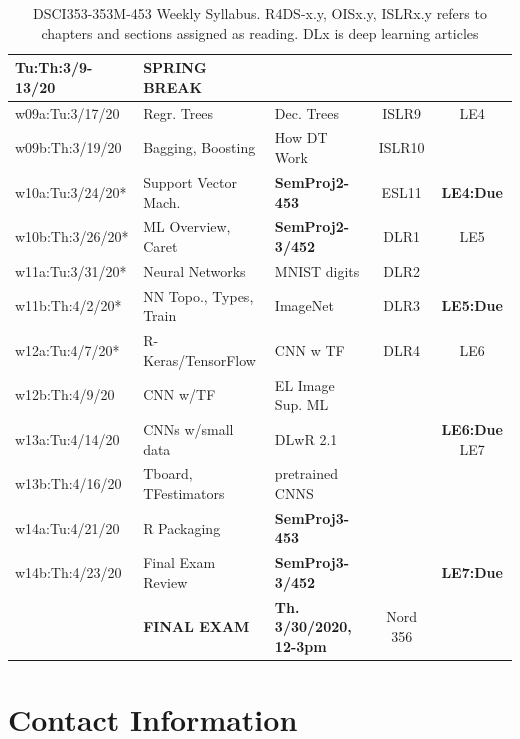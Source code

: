 \documentclass[11pt]{article} %
\begin{document}
\begin{table}[h]
\begin{tabular}{| l | p{4cm} | p{4cm} | c | c |}
    \hline
    \hline 
    Tu:Th:3/9-13/20 & {\bf SPRING BREAK} &  &  &  \\ 
    \hline
    \hline 
    w09a:Tu:3/17/20 & Regr. Trees & Dec. Trees & ISLR9 & LE4 \\ 
    \hline 
    w09b:Th:3/19/20 & Bagging, Boosting & How DT Work & ISLR10 &  \\
    \hline
    \hline
    w10a:Tu:3/24/20* & Support Vector Mach. & {\bf SemProj2-453} & ESL11 & {\bf LE4:Due}  \\	
    \hline
    w10b:Th:3/26/20* & ML Overview, Caret & {\bf SemProj2-3/452} & DLR1 & LE5 \\
    \hline
    \hline 
    w11a:Tu:3/31/20* & Neural Networks & MNIST digits & DLR2 &   \\ 
    \hline
    w11b:Th:4/2/20* & NN Topo., Types, Train & ImageNet &  DLR3 & {\bf LE5:Due} \\
    \hline
    \hline 
    w12a:Tu:4/7/20* & R-Keras/TensorFlow & CNN w TF & DLR4 & LE6 \\ 
    \hline
    w12b:Th:4/9/20 & CNN w/TF & EL Image Sup. ML &  &  \\
    \hline
    \hline 
    w13a:Tu:4/14/20 & CNNs w/small data & DLwR 2.1 &  & {\bf LE6:Due} LE7 \\ 
    \hline
    w13b:Th:4/16/20 & Tboard, TFestimators & pretrained CNNS &  &  \\
    \hline
    \hline 
    w14a:Tu:4/21/20 & R Packaging & {\bf SemProj3-453} &  &  \\ 
    \hline
    w14b:Th:4/23/20 & Final Exam Review & {\bf SemProj3-3/452} &  & {\bf LE7:Due} \\
    \hline
    \hline
      & {\bf FINAL EXAM} & {\bf Th. 3/30/2020, 12-3pm}  & Nord 356 & \\
    \hline
    \hline
  \end{tabular} 
  \caption{DSCI353-353M-453 Weekly Syllabus.  R4DS-x.y, OISx.y, ISLRx.y refers to chapters and sections assigned as reading. DLx is deep learning articles }
  \label{table:Syllabus2} %
  \end{table} 

\FloatBarrier

\section{Contact Information}
  
\end{document}
